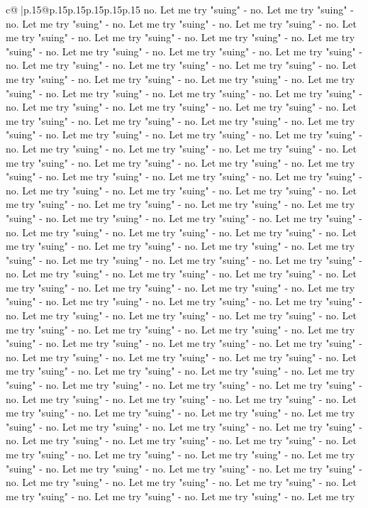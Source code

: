 \documentclass{article}
\begin{document}
{\begin{supertabular}{c@{$\;$}|p{.15\linewidth}@{}p{.15\linewidth}p{.15\linewidth}p{.15\linewidth}p{.15\linewidth}p{.15\linewidth}}
{{{no. Let me try "suing" {-} no. Let me try "suing" {-} no. Let me try "suing" {-} no. Let me try "suing" {-} no. Let me try "suing" {-} no. Let me try "suing" {-} no. Let me try "suing" {-} no. Let me try "suing" {-} no. Let me try "suing" {-} no. Let me try "suing" {-} no. Let me try "suing" {-} no. Let me try "suing" {-} no. Let me try "suing" {-} no. Let me try "suing" {-} no. Let me try "suing" {-} no. Let me try "suing" {-} no. Let me try "suing" {-} no. Let me try "suing" {-} no. Let me try "suing" {-} no. Let me try "suing" {-} no. Let me try "suing" {-} no. Let me try "suing" {-} no. Let me try "suing" {-} no. Let me try "suing" {-} no. Let me try "suing" {-} no. Let me try "suing" {-} no. Let me try "suing" {-} no. Let me try "suing" {-} no. Let me try "suing" {-} no. Let me try "suing" {-} no. Let me try "suing" {-} no. Let me try "suing" {-} no. Let me try "suing" {-} no. Let me try "suing" {-} no. Let me try "suing" {-} no. Let me try "suing" {-} no. Let me try "suing" {-} no. Let me try "suing" {-} no. Let me try "suing" {-} no. Let me try "suing" {-} no. Let me try "suing" {-} no. Let me try "suing" {-} no. Let me try "suing" {-} no. Let me try "suing" {-} no. Let me try "suing" {-} no. Let me try "suing" {-} no. Let me try "suing" {-} no. Let me try "suing" {-} no. Let me try "suing" {-} no. Let me try "suing" {-} no. Let me try "suing" {-} no. Let me try "suing" {-} no. Let me try "suing" {-} no. Let me try "suing" {-} no. Let me try "suing" {-} no. Let me try "suing" {-} no. Let me try "suing" {-} no. Let me try "suing" {-} no. Let me try "suing" {-} no. Let me try "suing" {-} no. Let me try "suing" {-} no. Let me try "suing" {-} no. Let me try "suing" {-} no. Let me try "suing" {-} no. Let me try "suing" {-} no. Let me try "suing" {-} no. Let me try "suing" {-} no. Let me try "suing" {-} no. Let me try "suing" {-} no. Let me try "suing" {-} no. Let me try "suing" {-} no. Let me try "suing" {-} no. Let me try "suing" {-} no. Let me try "suing" {-} no. Let me try "suing" {-} no. Let me try "suing" {-} no. Let me try "suing" {-} no. Let me try "suing" {-} no. Let me try "suing" {-} no. Let me try "suing" {-} no. Let me try "suing" {-} no. Let me try "suing" {-} no. Let me try "suing" {-} no. Let me try "suing" {-} no. Let me try "suing" {-} no. Let me try "suing" {-} no. Let me try "suing" {-} no. Let me try "suing" {-} no. Let me try "suing" {-} no. Let me try "suing" {-} no. Let me try "suing" {-} no. Let me try "suing" {-} no. Let me try "suing" {-} no. Let me try "suing" {-} no. Let me try "suing" {-} no. Let me try "suing" {-} no. Let me try "suing" {-} no. Let me try "suing" {-} no. Let me try "suing" {-} no. Let me try "suing" {-} no. Let me try "suing" {-} no. Let me try "suing" {-} no. Let me try "suing" {-} no. Let me try "suing" {-} no. Let me try "suing" {-} no. Let me try "suing" {-} no. Let me try "suing" {-} no. Let me try "suing" {-} no. Let me try "suing" {-} no. Let me try "suing" {-} no. Let me try "suing" {-} no. Let me try "suing" {-} no. Let me try "suing" {-} no. Let me try "suing" {-} no. Let me try "suing" {-} no. Let me try "suing" {-} no. Let me try "suing" {-} no. Let me try "suing" {-} no. Let me try }}}
\end{supertabular}}
\end{document}
